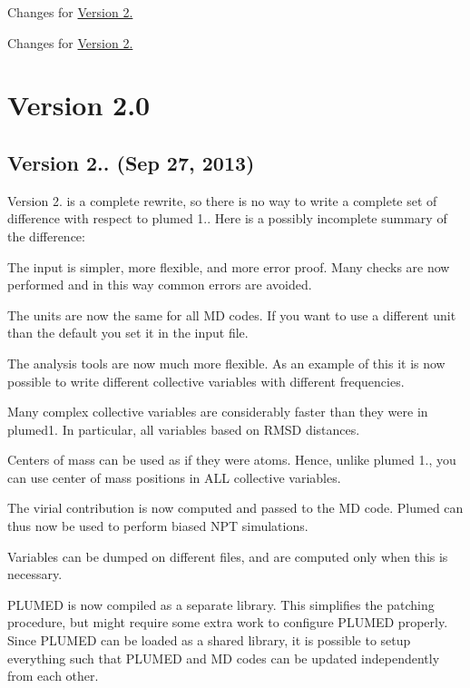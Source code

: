 
\begin{DoxyItemize}
\item Changes for \hyperlink{CHANGES-2-0}{Version 2.}
\item Changes for \hyperlink{CHANGES-2-1}{Version 2.} 
\end{DoxyItemize}\hypertarget{CHANGES-2-0}{}\section{Version 2.0}\label{CHANGES-2-0}
\subsection*{Version 2.. (Sep 27, 2013) }

Version 2. is a complete rewrite, so there is no way to write a complete set of difference with respect to plumed 1.. Here is a possibly incomplete summary of the difference\+:
\begin{DoxyItemize}
\item The input is simpler, more flexible, and more error proof. Many checks are now performed and in this way common errors are avoided.
\item The units are now the same for all M\+D codes. If you want to use a different unit than the default you set it in the input file.
\item The analysis tools are now much more flexible. As an example of this it is now possible to write different collective variables with different frequencies.
\item Many complex collective variables are considerably faster than they were in plumed1. In particular, all variables based on R\+M\+S\+D distances.
\item Centers of mass can be used as if they were atoms. Hence, unlike plumed 1., you can use center of mass positions in A\+L\+L collective variables.
\item The virial contribution is now computed and passed to the M\+D code. Plumed can thus now be used to perform biased N\+P\+T simulations.
\item Variables can be dumped on different files, and are computed only when this is necessary.
\item P\+L\+U\+M\+E\+D is now compiled as a separate library. This simplifies the patching procedure, but might require some extra work to configure P\+L\+U\+M\+E\+D properly. Since P\+L\+U\+M\+E\+D can be loaded as a shared library, it is possible to setup everything such that P\+L\+U\+M\+E\+D and M\+D codes can be updated independently from each other.
\end{DoxyItemize}

